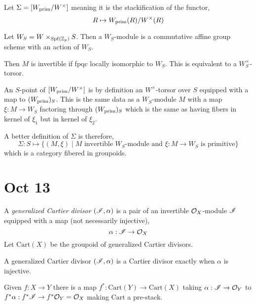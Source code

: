 \documentclass[12pt]{article}
\begin{document}
\begin{defn}
Let $\Sigma = [ W_{\mathrm{prim}} / W^\times]$ meaning it is the stackification of the functor,
\[ R \mapsto W_{\mathrm{prim}}(R) / W^\times(R) \]
\end{defn}


\begin{defn}
Let $W_S = W \times_{\mathrm{Spf}\left( \mathbb{Z}_p \right)} S$. Then a $W_S$-module is a commutative affine group scheme with an action of $W_S$. 
\end{defn}

\begin{defn}
Then $M$ is invertible if fpqc locally isomorphic to $W_S$. This is equivalent to a $W_S^\times$-torsor.
\end{defn}

\begin{rmk}
An $S$-point of $[W_{\mathrm{prim}} / W^\times]$ is by definition an $W^\times$-torsor over $S$ equipped with a map to $(W_{\mathrm{prim}})_S$. This is the same data as a $W_S$-module $M$ with a map $\xi : M \to W_S$ factoring through $(W_{\mathrm{prim}})_S$ which is the same as having fibers in kernel of $\xi_1$ but in kernel of $\xi_2$.
\end{rmk}

\begin{defn}
A better definition of $\Sigma$ is therefore,
\[ \Sigma : S \mapsto \{ (M, \xi) \mid M \text{ invertible } W_S\text{-module and } \xi : M \to W_S \text{ is primitive} \} \]
which is a category fibered in groupoids.
\end{defn}

\section{Oct 13}

\newcommand{\Cart}{\mathrm{Cart}}

\begin{defn}
A \textit{generalized Cartier divisor} $(\mathscr{I}, \alpha)$ is a pair of an invertible $\mathcal{O}_{X}$-module $\mathscr{I}$ equipped with a map (not necessarily injective),
\[ \alpha : \mathscr{I} \to \mathcal{O}_{X} \]
Let $\Cart(X)$ be the groupoid of generalized Cartier divisors. 
\end{defn}

\begin{rmk}
A generalized Cartier divisor $(\mathscr{I}, \alpha)$ is a Cartier divisor exactly when $\alpha$ is injective.
\end{rmk}

\begin{prop}
Given $f : X \to Y$ there is a map $f^* : \Cart(Y) \to \Cart(X)$ taking $\alpha : \mathscr{I} \to \mathcal{O}_{Y}$ to $f^* \alpha : f^* \mathscr{I} \to f^* \mathcal{O}_{Y} = \mathcal{O}_{X}$ making $\Cart$ a pre-stack.
\end{prop}
\end{document}
